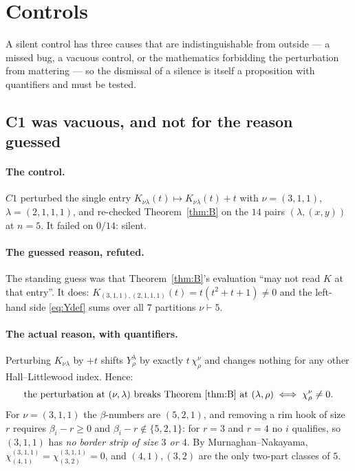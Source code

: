 \documentclass[11pt]{article}
\theoremstyle{plain}
\theoremstyle{definition}
\newcommand{\lam}{\lambda}
\begin{document}
\section{Controls}

A silent control has three causes that are indistinguishable from outside --- a missed bug, a
vacuous control, or the mathematics forbidding the perturbation from mattering --- so the
dismissal of a silence is itself a proposition with quantifiers and must be tested.

\subsection{C1 was vacuous, and not for the reason guessed}

\paragraph{The control.} $C1$ perturbed the single entry $K_{\nu\lam}(t)\mapsto K_{\nu\lam}(t)+t$
with $\nu=(3,1,1)$, $\lam=(2,1,1,1)$, and re-checked Theorem~\ref{thm:B} on the $14$ pairs
$(\lam,(x,y))$ at $n=5$. It failed on $0/14$: silent.

\paragraph{The guessed reason, refuted.} The standing guess was that Theorem~\ref{thm:B}'s
evaluation ``may not read $K$ at that entry''. It does: $K_{(3,1,1),(2,1,1,1)}(t)=t(t^2+t+1)\neq
0$ and the left-hand side \eqref{eq:Ydef} sums over all $7$ partitions $\nu\vdash 5$.

\paragraph{The actual reason, with quantifiers.} Perturbing $K_{\nu\lam}$ by $+t$ shifts
$Y^{\lam}_\rho$ by exactly $t\,\chi^{\nu}_{\rho}$ and changes nothing for any other
Hall--Littlewood index. Hence:
\begin{equation}\label{eq:c1}
  \text{the perturbation at }(\nu,\lam)\text{ breaks Theorem~\ref{thm:B} at }(\lam,\rho)
  \iff \chi^{\nu}_{\rho}\neq 0 .
\end{equation}
For $\nu=(3,1,1)$ the $\beta$-numbers are $(5,2,1)$, and removing a rim hook of size $r$ requires
$\beta_i-r\ge 0$ and $\beta_i-r\notin\{5,2,1\}$: for $r=3$ and $r=4$ no $i$ qualifies, so
$(3,1,1)$ has \emph{no border strip of size $3$ or $4$}. By Murnaghan--Nakayama,
$\chi^{(3,1,1)}_{(4,1)}=\chi^{(3,1,1)}_{(3,2)}=0$, and $(4,1),(3,2)$ are the only two-part
classes of $5$.
\end{document}
